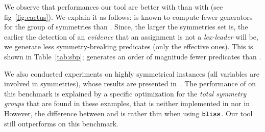 We observe that performances our tool are better with \bliss{} than with
\saucy{} (see fig~\ref{fig:cactus}). We explain it as follows: \saucy{} is
known to compute fewer generators for the group of symmetries than \bliss{}.
Since, the larger the symmetries set is, the earlier the detection of an
\emph{evidence} that an assignment is not a \textit{lex-leader} will be, we
generate less symmetry-breaking predicates (only the effective ones). This is
shown in Table~\ref{tab:sbp}; \cdclsym{} generates an order of magnitude fewer
predicates than \breakid{}.

\begin{table}[!htbp]
 \vspace*{0.1cm}
 \caption{Comparison of the number of generated SBPs each time \breakid{} and 
  \cdclsym{} both compute a verdict (number of verdicts between parentheses).}
 \label{tab:sbp}
\end{table}
We also conducted experiments on highly symmetrical instances (all variables
are involved in symmetries), whose results are presented
in~. The performance of \breakid{} on this benchmark is
explained by a specific optimization for the \emph{total symmetry groups} that
are found in these examples, that is neither implemented in \shatter{} nor in
\cdclsym{}. However, the difference between \breakid{} and \cdclsym{} is rather
thin when using $\texttt{bliss}{}$. Our tool still outperforms \shatter{} on this
benchmark.
